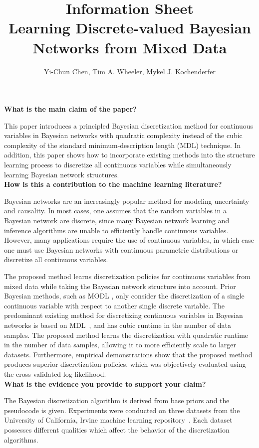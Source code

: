 \documentclass{article}
\title{Information Sheet \\ {\large Learning Discrete-valued Bayesian Networks from Mixed Data}}
\author{\normalsize Yi-Chun Chen, Tim A. Wheeler, Mykel J. Kochenderfer}
\date{}
\begin{document}
\maketitle

\noindent
\textbf{What is the main claim of the paper?}

This paper introduces a principled Bayesian discretization method for continuous variables in Bayesian networks with quadratic complexity instead of the cubic complexity of the standard minimum-description length (MDL) technique.
In addition, this paper shows how to incorporate existing methods into the structure learning process to discretize all continuous variables while simultaneously learning Bayesian network structures.\\[0em]

\noindent
\textbf{How is this a contribution to the machine learning literature?}

Bayesian networks are an increasingly popular method for modeling uncertainty and causality.
In most cases, one assumes that the random variables in a Bayesian network are discrete, since many Bayesian network learning and inference algorithms are unable to efficiently handle continuous variables.
However, many applications require the use of continuous variables, in which case one must use Bayesian networks with continuous parametric distributions or discretize all continuous variables.

The proposed method learns discretization policies for continuous variables from mixed data while taking the Bayesian network structure into account.
Prior Bayesian methods, such as MODL \citep{Boulle_2006, Lustgarten_2011}, only consider the discretization of a single continuous variable with respect to another single discrete variable.
The predominant existing method for discretizing continuous variables in Bayesian networks is based on MDL~\citep{Friedman_1996}, and has cubic runtime in the number of data samples.
The proposed method learns the discretization with quadratic runtime in the number of data samples, allowing it to more efficiently scale to larger datasets.
Furthermore, empirical demonstrations show that the proposed method produces superior discretization policies, which was objectively evaluated using the cross-validated log-likelihood.\\[0em]

\noindent
\textbf{What is the evidence you provide to support your claim?}

The Bayesian discretization algorithm is derived from base priors and the pseudocode is given.
Experiments were conducted on three datasets from the University of California, Irvine machine learning repository~\citep{Lichman_2013}.
Each dataset possesses different qualities which affect the behavior of the discretization algorithms.
\end{document}
